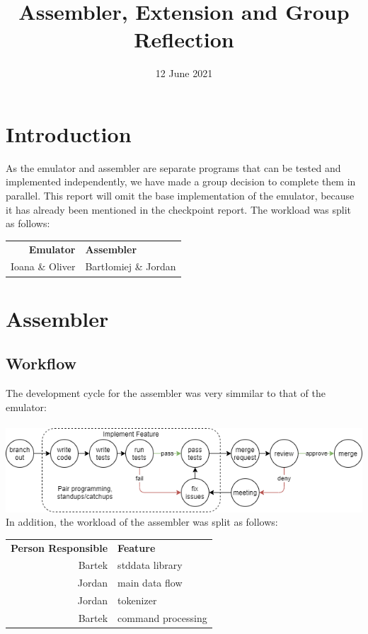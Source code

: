 \documentclass[11pt]{article}
\title{\vspace*{-1cm}Assembler, Extension and Group Reflection}
\date{\vspace*{-1cm}12 June 2021}
\begin{document}
\maketitle

\section{Introduction}
As the emulator and assembler are separate programs that can be tested and implemented independently, we have made a group decision to complete them in parallel. This report will omit the base implementation of the emulator, because it has already been mentioned in the checkpoint report. The workload was split as follows:
\begin{center}
	\begin{tabular}{ r | l }
		\textbf{Emulator} & \textbf{Assembler} \\
		Ioana \& Oliver & Bartłomiej \& Jordan
	\end{tabular}
\end{center}
\section{Assembler}
\subsection*{Workflow}
The development cycle for the assembler was very simmilar to that of the emulator:\\\\
\includegraphics[width = \textwidth]{development_cycle}
In addition, the workload of the assembler was split as follows:\\
\begin{center}
	\begin{tabular}{r|l}
		\textbf{Person Responsible} & \textbf{Feature} \\\
		Bartek & stddata library \\
		Jordan & main data flow \\
		Jordan & tokenizer \\
		Bartek & command processing \\
	\end{tabular}
\end{center}
\end{document}
